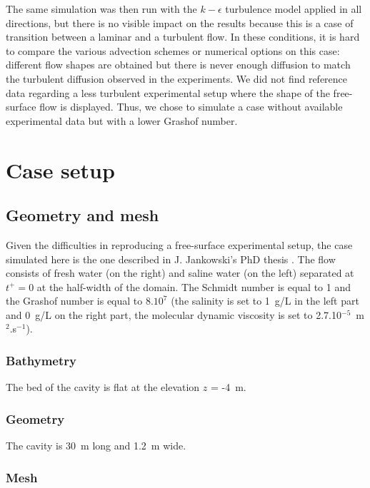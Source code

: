 The same simulation was then run with the $k-\epsilon$ turbulence model applied
in all directions,
but there is no visible impact on the results because this is a case of transition
between a laminar and a turbulent flow.
In these conditions, it is hard to compare the various advection
schemes or numerical options on this case:
different flow shapes are obtained but there is never enough
diffusion to match the turbulent diffusion observed in the experiments.
We did not find reference data regarding a less turbulent
experimental setup where the shape of the free-surface flow is displayed.
Thus, we chose to simulate a case without available
experimental data but with a lower Grashof number.

\section{Case setup}

\subsection{Geometry and mesh}

Given the difficulties in reproducing a free-surface experimental setup,
the case simulated here is
the one described in J. Jankowski's PhD thesis \cite{Jankowski1999}.
The flow consists of fresh water (on the right) and saline water (on the left)
separated at $t^+=0$ at the half-width of the domain.
The Schmidt number is equal to 1 and the Grashof number is equal to $8.10^{7}$
(the salinity is set to 1~g/L in the left part and 0~g/L on the right part,
the molecular dynamic viscosity is set to 2.7.10$^{-5}$~m$^2$.s$^{-1}$).

\subsubsection{Bathymetry}

The bed of the cavity is flat at the elevation $z$ = -4~m.

\subsubsection{Geometry}

The cavity is 30~m long and 1.2~m wide.

\subsubsection{Mesh}

